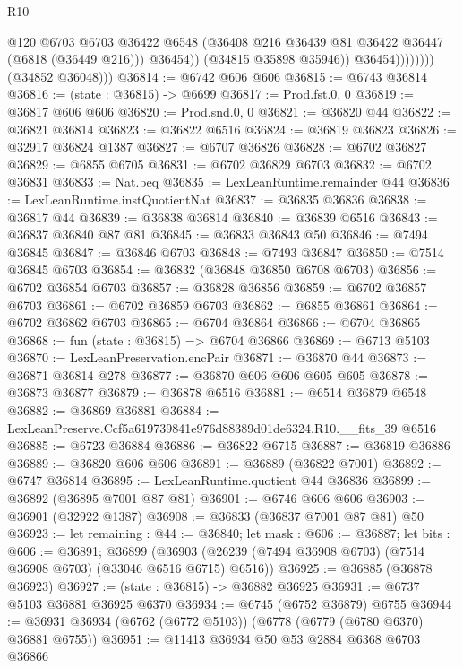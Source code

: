 \begin{lexlean}{R10}
\begin{coremodule}
                              @120
                              @6703
                              @6703
                              @36422
                              @6548
                              (@36408 @216 @36439 @81 @36422 @36447 (@6818 (@36449 @216)))
                              @36454))
                          (@34815 @35898 @35946))
                        @36454))))))))
        (@34852 @36048)))
@36814 := @6742 @606 @606
@36815 := @6743 @36814
@36816 := (state : @36815) -> @6699
@36817 := Prod.fst.{0, 0}
@36819 := @36817 @606 @606
@36820 := Prod.snd.{0, 0}
@36821 := @36820 @44
@36822 := @36821 @36814
@36823 := @36822 @6516
@36824 := @36819 @36823
@36826 := @32917 @36824 @1387
@36827 := @6707 @36826
@36828 := @6702 @36827
@36829 := @6855 @6705
@36831 := @6702 @36829 @6703
@36832 := @6702 @36831
@36833 := Nat.beq
@36835 := LexLeanRuntime.remainder @44
@36836 := LexLeanRuntime.instQuotientNat
@36837 := @36835 @36836
@36838 := @36817 @44
@36839 := @36838 @36814
@36840 := @36839 @6516
@36843 := @36837 @36840 @87 @81
@36845 := @36833 @36843 @50
@36846 := @7494 @36845
@36847 := @36846 @6703
@36848 := @7493 @36847
@36850 := @7514 @36845 @6703
@36854 := @36832 (@36848 @36850 @6708 @6703)
@36856 := @6702 @36854 @6703
@36857 := @36828 @36856
@36859 := @6702 @36857 @6703
@36861 := @6702 @36859 @6703
@36862 := @6855 @36861
@36864 := @6702 @36862 @6703
@36865 := @6704 @36864
@36866 := @6704 @36865
@36868 := fun (state : @36815) => @6704 @36866
@36869 := @6713 @5103
@36870 := LexLeanPreservation.encPair
@36871 := @36870 @44
@36873 := @36871 @36814 @278
@36877 := @36870 @606 @606 @605 @605
@36878 := @36873 @36877
@36879 := @36878 @6516
@36881 := @6514 @36879 @6548
@36882 := @36869 @36881
@36884 := LexLeanPreserve.Ccf5a619739841e976d88389d01de6324.R10.__fits_39 @6516
@36885 := @6723 @36884
@36886 := @36822 @6715
@36887 := @36819 @36886
@36889 := @36820 @606 @606
@36891 := @36889 (@36822 @7001)
@36892 := @6747 @36814
@36895 := LexLeanRuntime.quotient @44 @36836
@36899 := @36892 (@36895 @7001 @87 @81)
@36901 := @6746 @606 @606
@36903 := @36901 (@32922 @1387)
@36908 := @36833 (@36837 @7001 @87 @81) @50
@36923 := let remaining : @44 := @36840;
  let mask : @606 := @36887;
  let bits : @606 := @36891;
  @36899 (@36903 (@26239 (@7494 @36908 @6703) (@7514 @36908 @6703) (@33046 @6516 @6715) @6516))
@36925 := @36885 (@36878 @36923)
@36927 := (state : @36815) -> @36882 @36925
@36931 := @6737 @5103 @36881 @36925 @6370
@36934 := @6745 (@6752 @36879) @6755
@36944 := @36931 @36934 (@6762 (@6772 @5103)) (@6778 (@6779 (@6780 @6370) @36881 @6755))
@36951 := @11413 @36934 @50 @53 @2884 @6368 @6703 @36866

\end{coremodule}
\end{lexlean}
